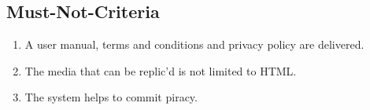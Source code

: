 \subsection{Must-Not-Criteria}\label{subsec:must-not-criteria}
\begin{enumerate}[label=\textit{MN \arabic*}]
    \item \label{mnc:1} A user manual, terms and conditions and privacy policy are delivered.
    \item \label{mnc:2} The media that can be replic'd is not limited to HTML\@.
    \item \label{mnc:3} The system helps to commit piracy.
\end{enumerate}